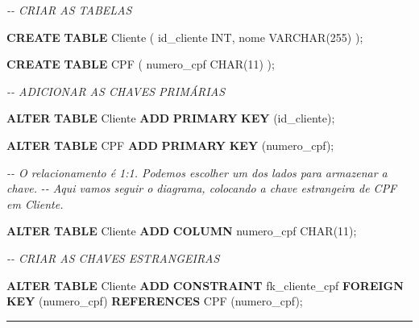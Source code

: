\documentclass[
]{book}
\newenvironment{Shaded}{\begin{snugshade}}{\end{snugshade}}
\newcommand{\CommentTok}[1]{\textcolor[rgb]{0.56,0.35,0.01}{\textit{#1}}}
\newcommand{\DataTypeTok}[1]{\textcolor[rgb]{0.13,0.29,0.53}{#1}}
\newcommand{\DecValTok}[1]{\textcolor[rgb]{0.00,0.00,0.81}{#1}}
\newcommand{\KeywordTok}[1]{\textcolor[rgb]{0.13,0.29,0.53}{\textbf{#1}}}
\newcommand{\NormalTok}[1]{#1}
\begin{document}
\begin{Shaded}
\begin{Highlighting}[]

\CommentTok{{-}{-} CRIAR AS TABELAS}

\KeywordTok{CREATE} \KeywordTok{TABLE}\NormalTok{ Cliente }
\NormalTok{(}
\NormalTok{    id\_cliente }\DataTypeTok{INT}\NormalTok{,}
\NormalTok{    nome }\DataTypeTok{VARCHAR}\NormalTok{(}\DecValTok{255}\NormalTok{)}
\NormalTok{);}

\KeywordTok{CREATE} \KeywordTok{TABLE}\NormalTok{ CPF }
\NormalTok{(}
\NormalTok{    numero\_cpf }\DataTypeTok{CHAR}\NormalTok{(}\DecValTok{11}\NormalTok{)}
\NormalTok{);}

\CommentTok{{-}{-} ADICIONAR AS CHAVES PRIMÁRIAS}

\KeywordTok{ALTER} \KeywordTok{TABLE}\NormalTok{ Cliente }\KeywordTok{ADD} \KeywordTok{PRIMARY} \KeywordTok{KEY}\NormalTok{ (id\_cliente);}

\KeywordTok{ALTER} \KeywordTok{TABLE}\NormalTok{ CPF }\KeywordTok{ADD} \KeywordTok{PRIMARY} \KeywordTok{KEY}\NormalTok{ (numero\_cpf);}


\CommentTok{{-}{-} O relacionamento é 1:1. Podemos escolher um dos lados para armazenar a chave.}
\CommentTok{{-}{-} Aqui vamos seguir o diagrama, colocando a chave estrangeira de CPF em Cliente.}

\KeywordTok{ALTER} \KeywordTok{TABLE}\NormalTok{ Cliente }\KeywordTok{ADD} \KeywordTok{COLUMN}\NormalTok{ numero\_cpf }\DataTypeTok{CHAR}\NormalTok{(}\DecValTok{11}\NormalTok{);}

\CommentTok{{-}{-} CRIAR AS CHAVES ESTRANGEIRAS}

\KeywordTok{ALTER} \KeywordTok{TABLE}\NormalTok{ Cliente }\KeywordTok{ADD} \KeywordTok{CONSTRAINT}\NormalTok{ fk\_cliente\_cpf }\KeywordTok{FOREIGN} \KeywordTok{KEY}\NormalTok{ (numero\_cpf) }\KeywordTok{REFERENCES}\NormalTok{ CPF (numero\_cpf);}
\end{Highlighting}
\end{Shaded}

\begin{center}\rule{0.5\linewidth}{0.5pt}\end{center}
\end{document}
